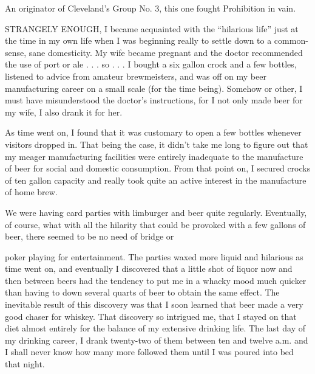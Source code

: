 

\bbChapterPreamble




\begin{biblechapter}
    An originator of Cleveland’s Group No. 3, 
    this one fought Prohibition in vain.
\end{biblechapter}


\begin{biblechapter}
    STRANGELY ENOUGH, 
    I became acquainted with the “hilarious life” 
    just at the time in my own life 
    when I was beginning really to settle down to a common-sense, 
    sane domesticity.
\verse My wife became pregnant 
    and the doctor recommended the use of port or ale 
    . . . so . . . I bought a six gallon crock and a few bottles, 
    listened to advice from amateur brewmeisters, 
    and was off on my beer manufacturing career on a small scale 
    (for the time being).
\verse Somehow or other, 
    I must have misunderstood the doctor’s instructions, 
    for I not only made beer for my wife, 
    I also drank it for her.

\verse As time went on, I found that it was customary to open a few bottles whenever visitors dropped in. That being the case, it didn’t take me long to figure out that my meager manufacturing facilities were entirely inadequate to the manufacture of beer for social and domestic consumption. From that point on, I secured crocks of ten gallon capacity and really took quite an active interest in the manufacture of home brew.

We were having card parties with limburger and beer quite regularly. Eventually, of course, what with all the hilarity that could be provoked with a few gallons of beer, there seemed to be no need of bridge or

poker playing for entertainment. The parties waxed more liquid and hilarious as time went on, and eventually I discovered that a little shot of liquor now and then between beers had the tendency to put me in a whacky mood much quicker than having to down several quarts of beer to obtain the same effect. The inevitable result of this discovery was that I soon learned that beer made a very good chaser for whiskey. That discovery so intrigued me, that I stayed on that diet almost entirely for the balance of my extensive drinking life. The last day of my drinking career, I drank twenty-two of them between ten and twelve a.m. and I shall never know how many more followed them until I was poured into bed that night.


\end{biblechapter}
